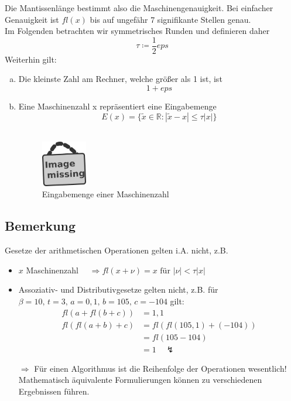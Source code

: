 \documentclass[ngerman,fontsize=11pt, paper=a4, parskip=half, titlepage=true, toc=bib]{scrbook}
\newcommand{\R}{\mathds{R}}
\begin{document}
Die Mantissenlänge bestimmt also die Maschinengenauigkeit. Bei einfacher Genauigkeit ist $fl(x)$ bis auf ungefähr 7 signifikante Stellen genau. \\
Im Folgenden betrachten wir symmetrisches Runden und definieren daher
\[ \tau \coloneqq \frac{1}{2}eps\]
Weiterhin gilt:
\begin{enumerate}[a)]
	\item Die kleinste Zahl am Rechner, welche größer als 1 ist, ist
					\[ 1 + eps \]
	\item Eine Maschinenzahl x repräsentiert eine Eingabemenge
					\[  E(x) = \{\widetilde{x} \in \R : |\widetilde{x}-x| \leq \tau|x|\} \] \\
				\begin{figure}
					\parbox{\linewidth}{
						\centering
						\includegraphics[width=2cm]{images/image_missing.jpg}
					}
					\caption{Eingabemenge einer Maschinenzahl}
				\end{figure}
\end{enumerate}

\subsection{Bemerkung} \label{3.1.7}
Gesetze der arithmetischen Operationen gelten i.A. nicht, z.B.
\begin{itemize}
	\item 	$x$ Maschinenzahl $\quad \Rightarrow fl(x+\nu) = x \text{     für }|\nu| < \tau |x|$
	\item Assoziativ- und Distributivgesetze gelten nicht, z.B. für $\beta = 10, \, t=3, \, a=0,1 ,\, b= 105 , \, c= -104$ gilt:
					\begin{align*}
						fl(a+fl(b+c)) &= 1,1 \\
						fl(fl(a+b)+c) &= fl(fl(105,1) + (-104) ) \\
							                &= fl(105-104) \\
							                &= 1 \quad \lightning
					\end{align*}
	\item[ $\Rightarrow$] Für einen Algorithmus ist die Reihenfolge der Operationen wesentlich!
									  Mathematisch äquivalente Formulierungen können zu verschiedenen Ergebnissen führen.
\end{itemize}
\end{document}
